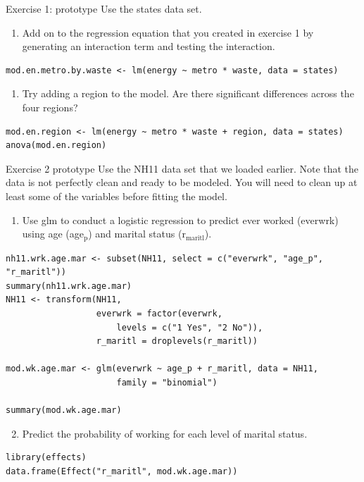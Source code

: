 \documentclass[table,smaller]{beamer}
\begin{document}
\begin{frame}[fragile,label=sec-6-2]{Exercise 1: prototype}
 Use the states data set.

\begin{enumerate}
\item Add on to the regression equation that you created in exercise 1 by generating an interaction term and testing the interaction.
\end{enumerate}
\begin{verbatim}
mod.en.metro.by.waste <- lm(energy ~ metro * waste, data = states)
\end{verbatim}

\begin{enumerate}
\item Try adding a region to the model. Are there significant differences across the four regions?
\end{enumerate}
\begin{verbatim}
mod.en.region <- lm(energy ~ metro * waste + region, data = states)
anova(mod.en.region)
\end{verbatim}
\end{frame}

\begin{frame}[fragile,label=sec-6-3]{Exercise 2 prototype}
 Use the NH11 data set that we loaded earlier. Note that the data is not perfectly clean and ready to be modeled. You will need to clean up at least some of the variables before fitting the model.

\begin{enumerate}
\setcounter{enumi}{0}
\item Use glm  to conduct a logistic regression to predict ever worked (everwrk) using age (age$_{\text{p}}$) and marital status (r$_{\text{maritl}}$).
\end{enumerate}
\begin{verbatim}
nh11.wrk.age.mar <- subset(NH11, select = c("everwrk", "age_p", "r_maritl"))
summary(nh11.wrk.age.mar)
NH11 <- transform(NH11,
                  everwrk = factor(everwrk,
                      levels = c("1 Yes", "2 No")),
                  r_maritl = droplevels(r_maritl))

mod.wk.age.mar <- glm(everwrk ~ age_p + r_maritl, data = NH11,
                      family = "binomial")

summary(mod.wk.age.mar)
\end{verbatim}

\begin{enumerate}
\setcounter{enumi}{1}
\item Predict the probability of working for each level of marital status.
\end{enumerate}
\begin{verbatim}
library(effects)
data.frame(Effect("r_maritl", mod.wk.age.mar))
\end{verbatim}
\end{frame}
\end{document}
